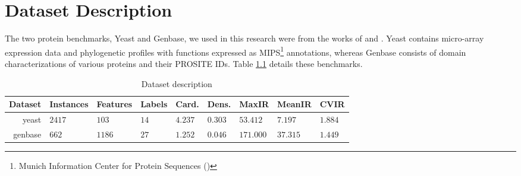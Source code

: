 %
%
%
%
%

\chapter{Dataset Description}
\label{AppendixDataset}

\par The two protein benchmarks, Yeast and Genbase, we used in this research
were from the works of \cite{elisseeff2001kernel} and
\cite{diplaris2005protein}.  Yeast contains micro-array expression data and
phylogenetic profiles with functions expressed as MIPS\footnote{ Munich
Information Center for Protein Sequences (\cite{mewes2006mips}) } annotations,
whereas Genbase consists of domain characterizations of various proteins and
their PROSITE IDs. Table \ref{setup:datasets} details these benchmarks.

\begin{table}[!h]
    \centering
    \caption{Dataset description}
    \label{setup:datasets}
    \begin{tabular}{@{}r*{8}{l}@{}}
        \toprule
        Dataset & Instances & Features & Labels & Card.    & Dens.   & MaxIR     & MeanIR   & CVIR     \\ \midrule
        yeast   & $2417$    & $103$    & $14$   & $4.237$  & $0.303$ & $53.412$  & $7.197$  & $1.884$  \\
        genbase & $662$     & $1186$   & $27$   & $1.252$  & $0.046$ & $171.000$ & $37.315$ & $1.449$  \\ \bottomrule
    \end{tabular}
\end{table}

